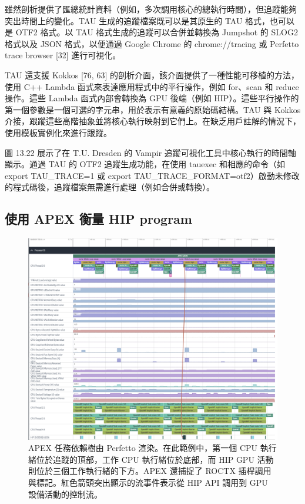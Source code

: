 雖然剖析提供了匯總統計資料（例如，多次調用核心的總執行時間），但追蹤能夠突出時間上的變化。TAU 生成的追蹤檔案既可以是其原生的 TAU 格式，也可以是 OTF2 格式。以 TAU 格式生成的追蹤可以合併並轉換為 Jumpshot 的 SLOG2 格式以及 JSON 格式，以便通過 Google Chrome 的 chrome://tracing 或 Perfetto trace browser [32] 進行可視化。

TAU 還支援 Kokkos [76, 63] 的剖析介面，該介面提供了一種性能可移植的方法，使用 C++ Lambda 函式來表達應用程式中的平行操作，例如 for、scan 和 reduce 操作。這些 Lambda 函式內部會轉換為 GPU 後端（例如 HIP）。這些平行操作的第一個參數是一個可選的字元串，用於表示有意義的原始碼結構。TAU 與 Kokkos 介接，跟蹤這些高階抽象並將核心執行映射到它們上。在缺乏用戶註解的情況下，使用模板實例化來進行跟蹤。

圖 13.22 展示了在 T.U. Dresden 的 Vampir 追蹤可視化工具中核心執行的時間軸顯示。通過 TAU 的 OTF2 追蹤生成功能，在使用 tauexec 和相應的命令（如 export TAU\_TRACE=1 或 export TAU\_TRACE\_FORMAT=otf2）啟動未修改的程式碼後，追蹤檔案無需進行處理（例如合併或轉換）。


\subsection{使用 APEX 衡量 HIP program}

\begin{figure}
    \centering
    \includegraphics[width=0.9\linewidth]{FileAusiliari/Screenshots/Figure13-20.png}
    \caption{APEX 任務依賴樹由 Perfetto 渲染。在此範例中，第一個 CPU 執行緒位於追蹤的頂部，工作 CPU 執行緒位於底部，而 HIP GPU 活動則位於三個工作執行緒的下方。APEX 還捕捉了 ROCTX 插桿調用與標記。紅色箭頭突出顯示的流事件表示從 HIP API 調用到 GPU 設備活動的控制流。}
    \label{fig:PAPI20}
\end{figure}

